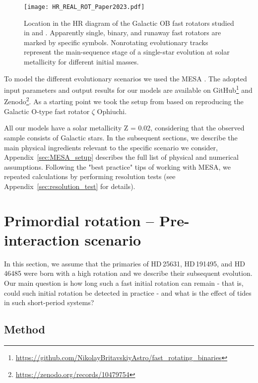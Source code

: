 \documentclass{aa}
\DeclareRobustCommand{\Appref}[1]{Appendix~\ref{#1}}
\begin{document}
\begin{figure}[!ht]
  \centering
  \texttt{[image: HR\_REAL\_ROT\_Paper2023.pdf]}
  \caption{Location in the HR diagram of the Galactic OB fast rotators studied in \citet{Britavskiy_2023} and \citet{Naze_2023_rot}. Apparently single, binary, and runaway fast rotators are marked by specific symbols. Nonrotating evolutionary tracks represent the main-sequence stage of a single-star evolution at solar metallicity for different initial masses.}
  \label{fig:hr_plot_paper2023}
\end{figure}


To model the different evolutionary scenarios we used the MESA
\citep[Modules for Experiments in Stellar Astrophysics, version
15140][]{Paxton2011, Paxton2013, Paxton2015, Paxton2018, Paxton2019,
  Jermyn2023}. The adopted input parameters and output results for our
models are available on GitHub\footnote{\url{https://github.com/NikolayBritavskiyAstro/fast_rotating_binaries}} and Zenodo\footnote{\url{https://zenodo.org/records/10479754}}. As a
starting point we took the setup from \citet{Renzo_2021} based
  on reproducing the Galactic O-type fast rotator $\zeta$ Ophiuchi.

All our models have a solar metallicity Z = 0.02, considering that the observed sample consists of
Galactic stars. In the subsequent sections, we describe the main
physical ingredients relevant to the specific scenario we consider,
\Appref{sec:MESA_setup} describes the full list of physical and
numerical assumptions. Following the "best practice" tips of working with MESA, we repeated calculations by performing resolution tests (see \Appref{sec:resolution_test} for details).


\section{Primordial rotation -- Pre-interaction scenario}
\label{sec:pre-interaction}

In this section, we assume that the primaries of HD\,25631, HD\,191495, and HD\,46485 were
born with a high rotation and we describe their subsequent
evolution.
Our main question is how long such a fast initial rotation can remain - that is, could such initial rotation be detected in practice -  and what is the effect of tides in such short-period systems?


\subsection{Method}
\end{document}
